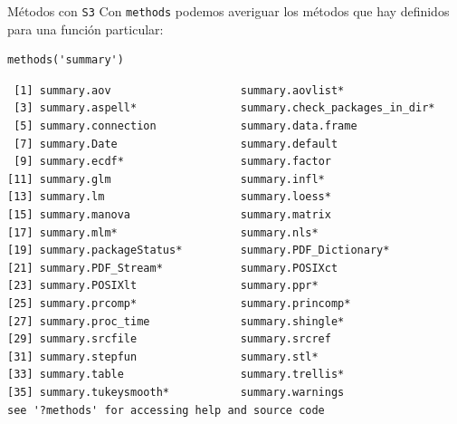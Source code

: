 \documentclass[xcolor={usenames,svgnames,dvipsnames}]{beamer}
\begin{document}
\begin{frame}[label={sec:org6209a40},fragile]{Métodos con \texttt{S3}}
 Con \texttt{methods} podemos averiguar los métodos que hay definidos para una función particular:
\lstset{language=r,label= ,caption= ,captionpos=b,numbers=none}
\begin{lstlisting}
methods('summary')
\end{lstlisting}

\begin{verbatim}
 [1] summary.aov                    summary.aovlist*              
 [3] summary.aspell*                summary.check_packages_in_dir*
 [5] summary.connection             summary.data.frame            
 [7] summary.Date                   summary.default               
 [9] summary.ecdf*                  summary.factor                
[11] summary.glm                    summary.infl*                 
[13] summary.lm                     summary.loess*                
[15] summary.manova                 summary.matrix                
[17] summary.mlm*                   summary.nls*                  
[19] summary.packageStatus*         summary.PDF_Dictionary*       
[21] summary.PDF_Stream*            summary.POSIXct               
[23] summary.POSIXlt                summary.ppr*                  
[25] summary.prcomp*                summary.princomp*             
[27] summary.proc_time              summary.shingle*              
[29] summary.srcfile                summary.srcref                
[31] summary.stepfun                summary.stl*                  
[33] summary.table                  summary.trellis*              
[35] summary.tukeysmooth*           summary.warnings              
see '?methods' for accessing help and source code
\end{verbatim}
\end{frame}
\end{document}
